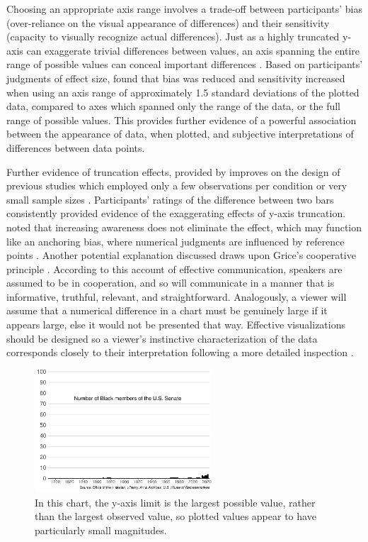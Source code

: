 \documentclass[journal]{vgtc}                %
\begin{document}
Choosing an appropriate axis range involves a trade-off between
participants' bias (over-reliance on the visual appearance of
differences) and their sensitivity (capacity to visually recognize
actual differences). Just as a highly truncated y-axis can exaggerate
trivial differences between values, an axis spanning the entire range of
possible values can conceal important differences \citep{witt_graph_2019}.
Based on participants' judgments of effect size, \citet{witt_graph_2019} found
that bias was reduced and sensitivity increased when using an axis range
of approximately 1.5 standard deviations of the plotted data, compared
to axes which spanned only the range of the data, or the full range of
possible values. This provides further evidence of a powerful
association between the appearance of data, when plotted, and subjective
interpretations of differences between data points.

Further evidence of truncation effects, provided by
\citet{yang_truncating_2021} improves on the design of previous studies which
employed only a few observations per condition \citep{pandey_how_2015} or
very small sample sizes \citep{witt_graph_2019}. Participants' ratings of
the difference between two bars consistently provided evidence of the
exaggerating effects of y-axis truncation. \citet{yang_truncating_2021} noted
that increasing awareness does not eliminate the effect, which may
function like an anchoring bias, where numerical judgments are
influenced by reference points \citep{tversky_judgment_1974}. Another
potential explanation discussed draws upon Grice's cooperative principle
\citep{grice_logic_1975}. According to this account of effective
communication, speakers are assumed to be in cooperation, and so will
communicate in a manner that is informative, truthful, relevant, and
straightforward. Analogously, a viewer will assume that a numerical
difference in a chart must be genuinely large if it appears large, else
it would not be presented that way. Effective visualizations should be
designed so a viewer's instinctive characterization of the data
corresponds closely to their interpretation following a more detailed
inspection \citep{yang_truncating_2021}.

\begin{figure}
\includegraphics[width=250px]{position_magnitude_files/figure-latex/senators-chart-1} \caption{In this chart, the y-axis limit is the largest possible value, rather than the largest observed value, so plotted values appear to have particularly small magnitudes.}\label{fig:senators-chart}
\end{figure}
\end{document}
